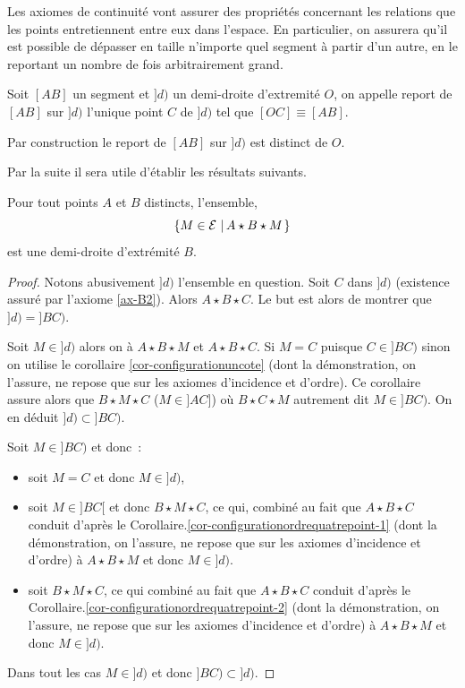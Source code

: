Les axiomes de continuité vont assurer des propriétés concernant les relations que les points entretiennent entre eux dans l'espace. En particulier, on assurera qu'il est possible de dépasser en taille n'importe quel segment à partir d'un autre, en le reportant un nombre de fois arbitrairement grand.
\begin{defi}[Report]
    Soit $[AB]$ un segment et $]d)$ un demi-droite d'extremité $O$, on appelle report de $[AB]$ sur $]d)$ l'unique point $C$ de $]d)$ tel que $[OC]\equiv [AB]$.
\end{defi}
\begin{rema}
    Par construction le report de $[AB]$ sur $]d)$ est distinct de $O$. 
\end{rema}
Par la suite il sera utile d'établir les résultats suivants.
\begin{prop}
Pour tout points $A$ et $B$ distincts, l'ensemble,
\begin{equation*}
    \left\{M\in \mathcal{E}\,\left|\,A\star B\star M\right.\right\}
\end{equation*}
est une demi-droite d'extrémité $B$.
\begin{proof}

    
    Notons abusivement $]d)$ l'ensemble en question. Soit $C$ dans $]d)$ (existence assuré par l'axiome \ref{ax-B2}). Alors $A\star B\star C$. Le but est alors de montrer que $]d)=]BC)$. 

    Soit $M\in ]d)$ alors on à $A\star B\star M$ et $A\star B\star C$. Si $M=C$ puisque $C\in ]BC)$ sinon on utilise le corollaire \ref{cor-configurationuncote} (dont la démonstration, on l'assure, ne repose que sur les axiomes d'incidence et d'ordre). Ce corollaire assure alors que $B\star M \star C$ (\cad $M\in]AC]$) où $B\star C\star M$ autrement dit $M\in ]BC)$. On en déduit $]d)\subset ]BC)$.

    Soit $M\in ]BC)$ et donc \,:
    \begin{itemize}[$\bullet$]
        \item soit $M=C$ et donc $M \in ]d)$,
        \item soit $M\in ]BC[$ et donc $B\star M\star C$, ce qui, combiné au fait que $A\star B\star C$ conduit d'après le Corollaire.\ref{cor-configurationordrequatrepoint-1} (dont la démonstration, on l'assure, ne repose que sur les axiomes d'incidence et d'ordre) à $A\star B \star M$ et donc $M\in ]d)$.
        \item soit $B \star M \star C$, ce qui combiné au fait que $A\star B\star C$ conduit d'après le Corollaire.\ref{cor-configurationordrequatrepoint-2} (dont la démonstration, on l'assure, ne repose que sur les axiomes d'incidence et d'ordre) à $A\star B \star M$ et donc $M\in ]d)$.
    \end{itemize}
    Dans tout les cas $M\in ]d)$ et donc $]BC)\subset ]d)$.
\end{proof}
\end{prop}
